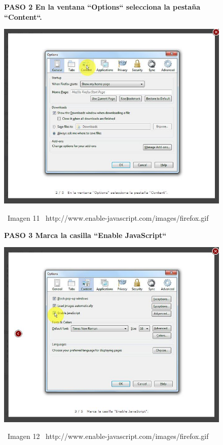 \documentclass[11pt]{article} %
\begin{document}
\begin{figure}
\begin{center}

\begin{center}
\bf PASO 2
En la ventana ``Options`` selecciona la pestaña ``Content``.


\includegraphics[height=8 cm, width=8 cm] {imagenes/firefox 02.jpg}
\end{center}
\ Imagen 11
\ {http://www.enable-javascript.com/images/firefox.gif }

\begin{center}
\bf PASO 3
Marca la casilla ``Enable JavaScript``
\newline

\includegraphics[height=8 cm, width=8 cm] {imagenes/firefox 03.jpg}
\end{center}
\ Imagen 12
\ {http://www.enable-javascript.com/images/firefox.gif }

\end{center}
\end{figure}
\end{document}
